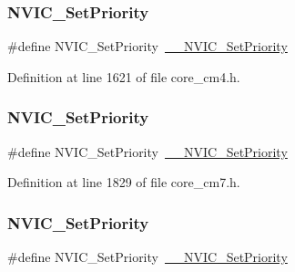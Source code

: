 \subsubsection{\texorpdfstring{N\+V\+I\+C\+\_\+\+Set\+Priority}{NVIC\_SetPriority}\hspace{0.1cm}{\footnotesize\ttfamily [9/13]}}
{\footnotesize\ttfamily \#define N\+V\+I\+C\+\_\+\+Set\+Priority~\hyperlink{group___c_m_s_i_s___core___n_v_i_c_functions_ga505338e23563a9c074910fb14e7d45fd}{\+\_\+\+\_\+\+N\+V\+I\+C\+\_\+\+Set\+Priority}}



Definition at line 1621 of file core\+\_\+cm4.\+h.

\mbox{\label{group___c_m_s_i_s___core___n_v_i_c_functions_gae0e9d0e2f7b6133828c71b57d4941c35}} 
\subsubsection{\texorpdfstring{N\+V\+I\+C\+\_\+\+Set\+Priority}{NVIC\_SetPriority}\hspace{0.1cm}{\footnotesize\ttfamily [10/13]}}
{\footnotesize\ttfamily \#define N\+V\+I\+C\+\_\+\+Set\+Priority~\hyperlink{group___c_m_s_i_s___core___n_v_i_c_functions_ga505338e23563a9c074910fb14e7d45fd}{\+\_\+\+\_\+\+N\+V\+I\+C\+\_\+\+Set\+Priority}}



Definition at line 1829 of file core\+\_\+cm7.\+h.

\mbox{\label{group___c_m_s_i_s___core___n_v_i_c_functions_gae0e9d0e2f7b6133828c71b57d4941c35}} 
\subsubsection{\texorpdfstring{N\+V\+I\+C\+\_\+\+Set\+Priority}{NVIC\_SetPriority}\hspace{0.1cm}{\footnotesize\ttfamily [11/13]}}
{\footnotesize\ttfamily \#define N\+V\+I\+C\+\_\+\+Set\+Priority~\hyperlink{group___c_m_s_i_s___core___n_v_i_c_functions_ga505338e23563a9c074910fb14e7d45fd}{\+\_\+\+\_\+\+N\+V\+I\+C\+\_\+\+Set\+Priority}}



